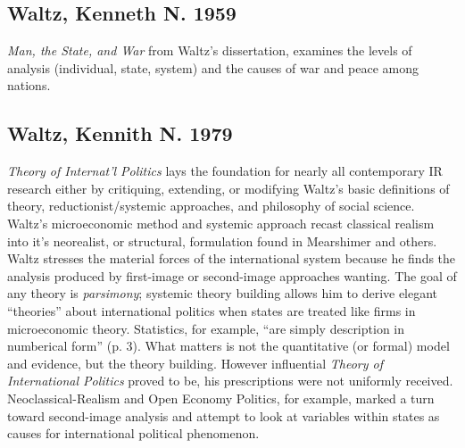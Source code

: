 \documentclass[11pt]{article}
\begin{document}
\subsection{Waltz, Kenneth N. 1959}
\label{sec-6-8}
\emph{Man, the State, and War} from Waltz's dissertation, examines the
levels of analysis (individual, state, system) and the causes of war
and peace among nations. 
\subsection{Waltz, Kennith N. 1979}
\label{sec-6-9}
\emph{Theory of Internat'l Politics} lays the foundation for nearly
all contemporary IR research either by critiquing, extending, or
modifying Waltz's basic definitions of theory, reductionist/systemic
approaches, and philosophy of social science. Waltz's microeconomic
method and systemic approach recast classical realism into it's
neorealist, or structural, formulation found in Mearshimer and
others. Waltz stresses the material forces of the international system
because he finds the analysis produced by first-image or second-image
approaches wanting. The goal of any theory is \emph{parsimony}; systemic
theory building allows him to derive elegant ``theories'' about
international politics when states are treated like firms in
microeconomic theory. Statistics, for example, ``are simply description
in numberical form'' (p. 3). What matters is not the quantitative (or
formal) model and evidence, but the theory building. However
influential \emph{Theory of International Politics} proved to be, his
prescriptions were not uniformly received. Neoclassical-Realism and
Open Economy Politics, for example, marked a turn toward second-image
analysis and attempt to look at variables within states as causes for
international political phenomenon. 
\end{document}
